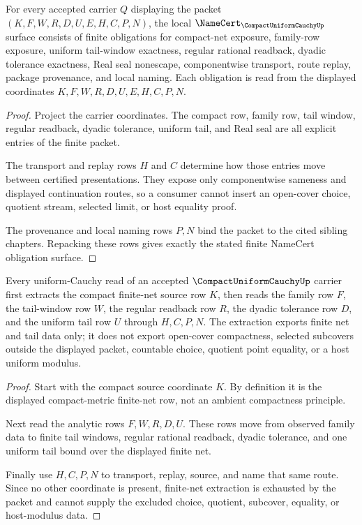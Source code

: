 \begin{theorem}
\label{thm:compact-uniform-cauchy-namecert-obligations}
For every accepted carrier $Q$ displaying the packet $(K,F,W,R,D,U,E,H,C,P,N)$, the local $\NameCert_{\CompactUniformCauchyUp}$ surface consists of finite obligations for compact-net exposure, family-row exposure, uniform tail-window exactness, regular rational readback, dyadic tolerance exactness, Real seal nonescape, componentwise transport, route replay, package provenance, and local naming. Each obligation is read from the displayed coordinates $K,F,W,R,D,U,E,H,C,P,N$.
\end{theorem}
\begin{proof}
Project the carrier coordinates. The compact row, family row, tail window, regular readback, dyadic tolerance, uniform tail, and Real seal are all explicit entries of the finite packet.

The transport and replay rows $H$ and $C$ determine how those entries move between certified presentations. They expose only componentwise sameness and displayed continuation routes, so a consumer cannot insert an open-cover choice, quotient stream, selected limit, or host equality proof.

The provenance and local naming rows $P,N$ bind the packet to the cited sibling chapters. Repacking these rows gives exactly the stated finite NameCert obligation surface.
\end{proof}

\begin{theorem}
\label{thm:compact-uniform-cauchy-finite-net-extraction}
Every uniform-Cauchy read of an accepted $\CompactUniformCauchyUp$ carrier first extracts the compact finite-net source row $K$, then reads the family row $F$, the tail-window row $W$, the regular readback row $R$, the dyadic tolerance row $D$, and the uniform tail row $U$ through $H,C,P,N$. The extraction exports finite net and tail data only; it does not export open-cover compactness, selected subcovers outside the displayed packet, countable choice, quotient point equality, or a host uniform modulus.
\end{theorem}
\begin{proof}
Start with the compact source coordinate $K$. By definition it is the displayed compact-metric finite-net row, not an ambient compactness principle.

Next read the analytic rows $F,W,R,D,U$. These rows move from observed family data to finite tail windows, regular rational readback, dyadic tolerance, and one uniform tail bound over the displayed finite net.

Finally use $H,C,P,N$ to transport, replay, source, and name that same route. Since no other coordinate is present, finite-net extraction is exhausted by the packet and cannot supply the excluded choice, quotient, subcover, equality, or host-modulus data.
\end{proof}

